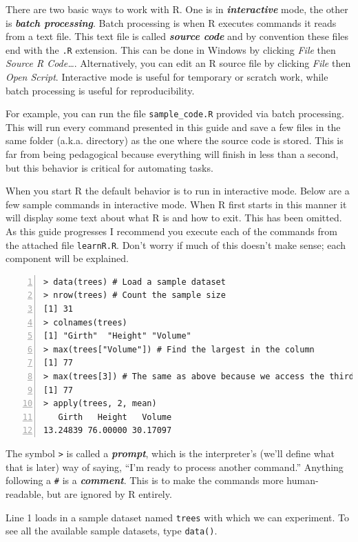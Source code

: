 \documentclass[12pt]{article}
\theoremstyle{remark}
\newcommand{\vocab}[1]{\textbf{\emph{#1}}}
\begin{document}
There are two basic ways to work with R. One is in \vocab{interactive} mode, the other is \vocab{batch processing}. Batch processing is when R executes commands it reads from a text file. This text file is called \vocab{source code} and by convention these files end with the \verb|.R| extension. This can be done in Windows by clicking \emph{File} then \emph{Source R Code\dots}. Alternatively, you can edit an R source file by clicking \emph{File} then \emph{Open Script}. Interactive mode is useful for temporary or scratch work, while batch processing is useful for reproducibility.

For example, you can run the file \verb|sample_code.R| provided via batch processing. This will run every command presented in this guide and save a few files in the same folder (a.k.a. directory) as the one where the source code is stored. This is far from being pedagogical because everything will finish in less than a second, but this behavior is critical for automating tasks.

When you start R the default behavior is to run in interactive mode. Below are a few sample commands in interactive mode. When R first starts in this manner it will display some text about what R is and how to exit. This has been omitted. As this guide progresses I recommend you execute each of the commands from the attached file \verb|learnR.R|. Don't worry if much of this doesn't make sense; each component will be explained.

\begin{Verbatim}[frame=single, fontsize=\small, numbers=left ]
> data(trees) # Load a sample dataset
> nrow(trees) # Count the sample size
[1] 31
> colnames(trees)
[1] "Girth"  "Height" "Volume"
> max(trees["Volume"]) # Find the largest in the column
[1] 77
> max(trees[3]) # The same as above because we access the third column
[1] 77
> apply(trees, 2, mean)
   Girth   Height   Volume 
13.24839 76.00000 30.17097 
\end{Verbatim}

The symbol \verb|>| is called a \vocab{prompt}, which is the interpreter's (we'll define what that is later) way of saying, ``I'm ready to process another command.'' Anything following a \verb|#| is a \vocab{comment}. This is to make the commands more human-readable, but are ignored by R entirely.

Line 1 loads in a sample dataset named \verb|trees| with which we can experiment. To see all the available sample datasets, type \verb|data()|.
\end{document}
